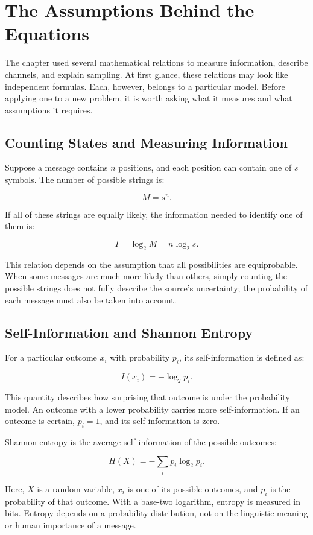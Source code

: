 \chapter{The Assumptions Behind the Equations}
\label{app:information-formulas}

The chapter used several mathematical relations to measure information, describe channels, and explain sampling. At first glance, these relations may look like independent formulas. Each, however, belongs to a particular model. Before applying one to a new problem, it is worth asking what it measures and what assumptions it requires.

\section{Counting States and Measuring Information}

Suppose a message contains \(n\) positions, and each position can contain one of \(s\) symbols. The number of possible strings is:

\[
M=s^n.
\]

If all of these strings are equally likely, the information needed to identify one of them is:

\[
I=\log_2 M=n\log_2 s.
\]

This relation depends on the assumption that all possibilities are equiprobable. When some messages are much more likely than others, simply counting the possible strings does not fully describe the source's uncertainty; the probability of each message must also be taken into account.

\section{Self-Information and Shannon Entropy}

For a particular outcome \(x_i\) with probability \(p_i\), its self-information is defined as:

\[
I(x_i)=-\log_2 p_i.
\]

This quantity describes how surprising that outcome is under the probability model. An outcome with a lower probability carries more self-information. If an outcome is certain, \(p_i=1\), and its self-information is zero.

Shannon entropy is the average self-information of the possible outcomes:

\[
H(X)=-\sum_i p_i\log_2 p_i.
\]

Here, \(X\) is a random variable, \(x_i\) is one of its possible outcomes, and \(p_i\) is the probability of that outcome. With a base-two logarithm, entropy is measured in bits. Entropy depends on a probability distribution, not on the linguistic meaning or human importance of a message.


